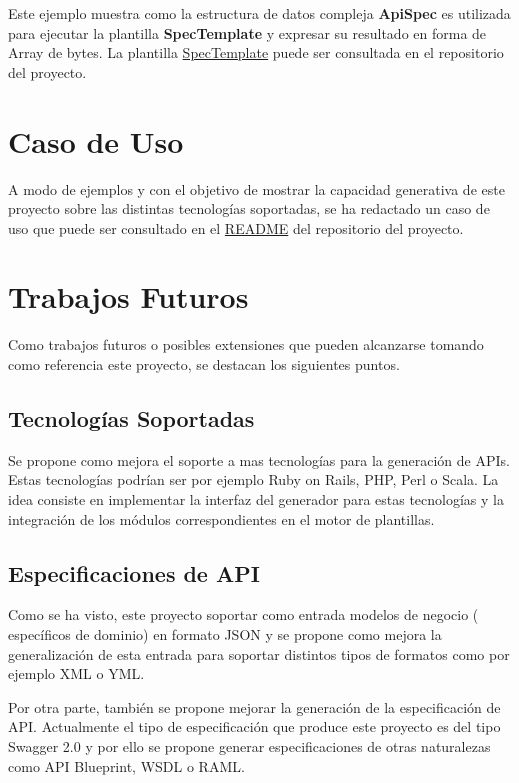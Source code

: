 \documentclass{svproc}
\begin{document}
Este ejemplo muestra como la estructura de datos compleja  \textbf{ ApiSpec} es utilizada para ejecutar la plantilla \textbf{SpecTemplate} y expresar su resultado en forma de Array de bytes. La plantilla  \href{https://github.com/hugobarzano/apigena/blob/master/gen/internal/core/commons/defineSpecTemplate.go}{SpecTemplate}  puede ser consultada en el repositorio del proyecto. 


\section{Caso de Uso}

A modo de ejemplos y con el objetivo de mostrar la capacidad generativa de este proyecto sobre las distintas tecnologías soportadas, se ha redactado un caso de uso que puede ser consultado en el \href{https://github.com/hugobarzano/apigena/blob/master/README.md
}{README} del repositorio del proyecto. 
\section{Trabajos Futuros}

Como trabajos futuros o posibles extensiones que pueden alcanzarse tomando como referencia este proyecto, se destacan los siguientes puntos. 

\subsection{Tecnologías Soportadas}
Se propone como mejora el soporte a  mas tecnologías para la generación de APIs. Estas tecnologías podrían ser por ejemplo Ruby on Rails, PHP, Perl o Scala. La idea consiste en implementar la interfaz del generador para estas tecnologías y la integración de los módulos correspondientes en el motor de plantillas. 
\subsection{Especificaciones de API}
Como se ha visto, este proyecto soportar como entrada modelos de negocio ( específicos de dominio) en formato JSON y se propone como mejora la generalización de esta entrada para soportar distintos tipos de formatos como por ejemplo XML o YML. 

Por otra parte,  también se propone mejorar la generación de la especificación de API. Actualmente el tipo de especificación que produce este proyecto es del tipo  Swagger 2.0  y por ello se propone generar especificaciones de otras naturalezas como  API Blueprint, WSDL o RAML. 



\end{document}

